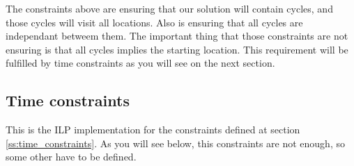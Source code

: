 \documentclass[]{report}
\begin{document}
The constraints above are ensuring that our solution will contain cycles, and those cycles will visit all locations. Also is ensuring that all cycles are independant betweem them. The important thing that those constraints are not ensuring is that all cycles implies the starting location. This requirement will be fulfilled by time constraints as you will see on the next section.

\subsection{Time constraints}

This is the ILP implementation for the constraints defined at section \ref{ss:time_constraints}. As you will see below, this constraints are not enough, so some other have to be defined.
\end{document}
